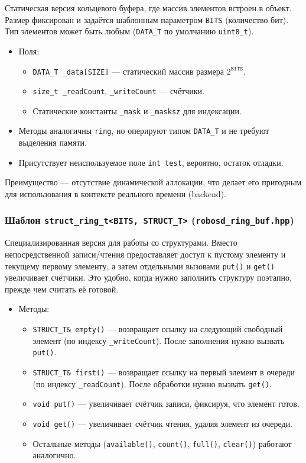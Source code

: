 \documentclass[a4paper,12pt]{article}
\begin{document}
Статическая версия кольцевого буфера, где массив элементов встроен в объект. Размер фиксирован и задаётся шаблонным параметром \texttt{BITS} (количество бит). Тип элементов может быть любым (\texttt{DATA\_T} по умолчанию \texttt{uint8\_t}).

\begin{itemize}
    \item Поля:
        \begin{itemize}
            \item \texttt{DATA\_T \_data[SIZE]} — статический массив размера $2^{\texttt{BITS}}$.
            \item \texttt{size\_t \_readCount}, \texttt{\_writeCount} — счётчики.
            \item Статические константы \texttt{\_mask} и \texttt{\_masksz} для индексации.
        \end{itemize}
    \item Методы аналогичны \texttt{ring}, но оперируют типом \texttt{DATA\_T} и не требуют выделения памяти.
    \item Присутствует неиспользуемое поле \texttt{int test}, вероятно, остаток отладки.
\end{itemize}

Преимущество — отсутствие динамической аллокации, что делает его пригодным для использования в контексте реального времени (backend).

\subsubsection{Шаблон \texttt{struct\_ring\_t<BITS, STRUCT\_T>} (\texttt{robosd\_ring\_buf.hpp})}

Специализированная версия для работы со структурами. Вместо непосредственной записи/чтения предоставляет доступ к пустому элементу и текущему первому элементу, а затем отдельными вызовами \texttt{put()} и \texttt{get()} увеличивает счётчики. Это удобно, когда нужно заполнить структуру поэтапно, прежде чем считать её готовой.

\begin{itemize}
    \item Методы:
        \begin{itemize}
            \item \texttt{STRUCT\_T\& empty()} — возвращает ссылку на следующий свободный элемент (по индексу \texttt{\_writeCount}). После заполнения нужно вызвать \texttt{put()}.
            \item \texttt{STRUCT\_T\& first()} — возвращает ссылку на первый элемент в очереди (по индексу \texttt{\_readCount}). После обработки нужно вызвать \texttt{get()}.
            \item \texttt{void put()} — увеличивает счётчик записи, фиксируя, что элемент готов.
            \item \texttt{void get()} — увеличивает счётчик чтения, удаляя элемент из очереди.
            \item Остальные методы (\texttt{available()}, \texttt{count()}, \texttt{full()}, \texttt{clear()}) работают аналогично.
        \end{itemize}
\end{itemize}
\end{document}
